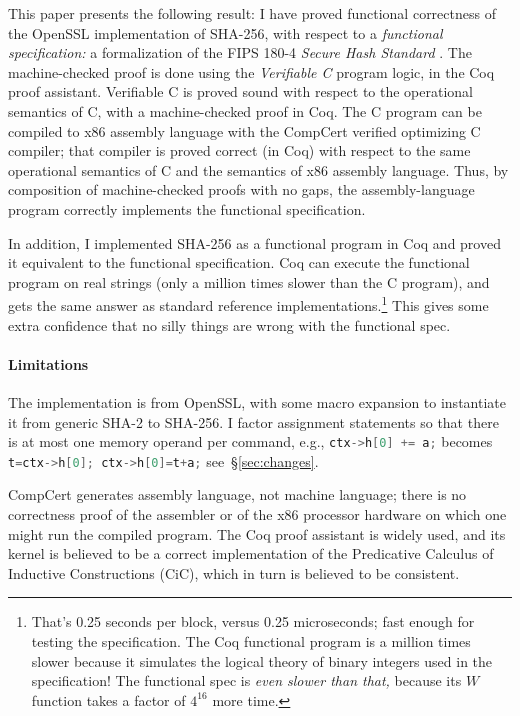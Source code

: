 \documentclass[prodmode,acmtoplas]{acmsmall}
\begin{document}
This paper presents the following result:
I have proved functional correctness
of the OpenSSL implementation of SHA-256,
with respect to a \emph{functional 
specification:} a formalization of the FIPS 180-4
\emph{Secure Hash Standard} \cite{fips180-4}.
The machine-checked proof is done using the 
\emph{Verifiable C} program logic,
in the Coq proof assistant.
Verifiable C is proved sound with respect to
the operational semantics of C,
with a machine-checked proof in Coq.
The C program can be compiled to x86
assembly language with the
CompCert verified optimizing C compiler;
that compiler is proved correct (in Coq) with respect
to the same operational semantics of C
and the semantics of x86 assembly language.
Thus, by composition of machine-checked proofs
with no gaps, the assembly-language program
correctly implements the functional specification.

In addition, I implemented SHA-256 as a
functional program in Coq and proved it
equivalent to the functional specification.
Coq can execute the functional program
on real strings
(only a million times slower than the C program), and gets
the same answer as standard reference implementations.\footnote{
That's 0.25 seconds per block, versus 0.25 microseconds;
fast enough for testing the specification.
The Coq functional program is a million times slower because it simulates the
logical theory of binary integers used in the specification!  
The functional spec is \emph{even slower than that,} because its
$W$ function takes a factor of $4^{16}$ more time.}
This gives some extra confidence that no
silly things are wrong with the functional spec.

\paragraph{Limitations}
The implementation is from OpenSSL, with some
macro expansion to instantiate it
from generic SHA-2 to SHA-256.
I factor assignment statements so that
there is at most one memory operand per command,
e.g., \lstinline[language=C]{ctx->h[0] += a;} becomes
\lstinline[language=C]{t=ctx->h[0]; ctx->h[0]=t+a;}
see~\S\ref{sec:changes}.

CompCert generates assembly language, not
machine language; there is no correctness
proof of the assembler or of the 
x86 processor hardware 
on which one might run the compiled program.
The Coq proof assistant is widely used,
and its kernel is believed to be a correct
implementation of the Predicative Calculus of Inductive
Constructions (CiC), which in turn
is believed to be consistent.
\end{document}
